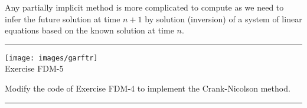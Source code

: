Any partially implicit method is more complicated to compute as we need to infer the future solution 
at time $n+1$ by solution (inversion) of a system of linear equations based on the known solution at time $n$. 

\begin{center}

\end{center}

\begin{center}
\begin{minipage}[t]{0.77\textwidth}
\par\noindent\rule{\textwidth}{0.4pt}

\begin{center}
\texttt{[image: images/garftr]} \\
{\color{orange}Exercise FDM-5}
\end{center}

Modify the code of Exercise FDM-4 to implement the Crank-Nicolson method.

\par\noindent\rule{\textwidth}{0.4pt}
\end{minipage}
\end{center}





